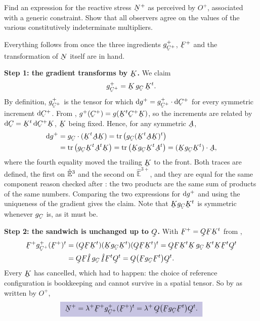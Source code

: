 \begin{problem}
Find an expression for the reactive stress $\bN^{+}$ as perceived by
$O^{+}$, associated with a generic constraint. Show that all observers
agree on the values of the various constitutively indeterminate
multipliers.
\end{problem}

\begin{solution}
Everything follows from  once the three ingredients
$g^{+}_{\bC^{+}}$, $\bF^{+}$ and the transformation of $\bN$ itself are
in hand.

\textbf{Step 1: the gradient transforms by $\bK$.} We claim
\[
   g^{+}_{\bC^{+}}=\bK\,g_{\bC}\,\bK^{t}.
\]
By definition, $g^{+}_{\bC^{+}}$ is the tensor for which
$\dl g^{+}=g^{+}_{\bC^{+}}\cdot\dl\bC^{+}$ for every symmetric increment
$\dl\bC^{+}$. From , $g^{+}(\bC^{+})=g(\bK^{t}\bC^{+}\bK)$, so
the increments are related by $\dl\bC=\bK^{t}\,\dl\bC^{+}\bK$, $\bK$
being fixed. Hence, for any symmetric $\bA$,
\[
\begin{aligned}
   \dl g^{+}&=g_{\bC}\cdot(\bK^{t}\bA\bK)
   =\tr\big(g_{\bC}(\bK^{t}\bA\bK)^{t}\big)
   \\
   &=\tr\big(g_{\bC}\bK^{t}\bA^{t}\bK\big)
   =\tr\big(\bK g_{\bC}\bK^{t}\bA^{t}\big)
   =(\bK g_{\bC}\bK^{t})\cdot\bA ,
\end{aligned}
\]
where the fourth equality moved the trailing $\bK$ to the front. Both
traces are defined, the first on $\hat{\mathbb{E}}^{3}$ and the second on
$\hat{\mathbb{E}}^{3+}$, and they are equal for the same component
reason checked after :
the two products are the same sum of products of the same numbers.
Comparing the two expressions for $\mathrm{d} g^{+}$ and using the uniqueness of
the gradient gives the claim. Note that $\bK g_{\bC}\bK^{t}$ is symmetric
whenever $g_{\bC}$ is, as it must be.

\textbf{Step 2: the sandwich is unchanged up to $\bQ$.} With
$\bF^{+}=\bQ\bF\bK^{t}$ from ,
\[
\begin{aligned}
   \bF^{+}g^{+}_{\bC^{+}}(\bF^{+})^{t}
   &=(\bQ\bF\bK^{t})(\bK g_{\bC}\bK^{t})(\bQ\bF\bK^{t})^{t}
   =\bQ\bF\bK^{t}\bK\,g_{\bC}\,\bK^{t}\bK\bF^{t}\bQ^{t}\\
   &=\bQ\bF\hI\,g_{\bC}\,\hI\bF^{t}\bQ^{t}
   =\bQ\big(\bF g_{\bC}\bF^{t}\big)\bQ^{t}.
\end{aligned}
\]
Every $\bK$ has cancelled, which had to happen: the choice of reference
configuration is bookkeeping and cannot survive in a spatial tensor. So
by  as written by $O^{+}$,
\[
   \boxed{\ \bN^{+}=\lambda^{+}\bF^{+}g^{+}_{\bC^{+}}(\bF^{+})^{t}
   =\lambda^{+}\,\bQ\big(\bF g_{\bC}\bF^{t}\big)\bQ^{t}.\ }
\]


\end{solution}
